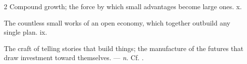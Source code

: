 \begin{multicols}{2}
 Compound growth; the force by which small advantages become large ones.   x.

 The countless small works of an open economy, which together outbuild any single plan.   ix.

 The craft of telling stories that build things; the manufacture of the futures that draw investment toward themselves. —  \textit{n.} Cf. .

\end{multicols}

